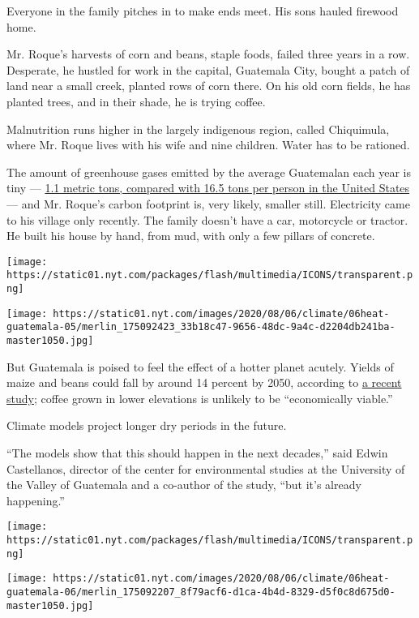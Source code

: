 Everyone in the family pitches in to make ends meet. His sons hauled
firewood home.

Mr. Roque's harvests of corn and beans, staple foods, failed three years
in a row. Desperate, he hustled for work in the capital, Guatemala City,
bought a patch of land near a small creek, planted rows of corn there.
On his old corn fields, he has planted trees, and in their shade, he is
trying coffee.

Malnutrition runs higher in the largely indigenous region, called
Chiquimula, where Mr. Roque lives with his wife and nine children. Water
has to be rationed.

The amount of greenhouse gases emitted by the average Guatemalan each
year is tiny ---
\href{https://data.worldbank.org/indicator/EN.ATM.CO2E.PC?locations=GT}{}
\href{https://data.worldbank.org/indicator/EN.ATM.CO2E.PC?locations=GT}{1.1
metric tons, compared with 16.5 tons per person in the United States}
--- and Mr. Roque's carbon footprint is, very likely, smaller still.
Electricity came to his village only recently. The family doesn't have a
car, motorcycle or tractor. He built his house by hand, from mud, with
only a few pillars of concrete.

\texttt{[image: https://static01.nyt.com/packages/flash/multimedia/ICONS/transparent.png]}

\texttt{[image: https://static01.nyt.com/images/2020/08/06/climate/06heat-guatemala-05/merlin\_175092423\_33b18c47-9656-48dc-9a4c-d2204db241ba-master1050.jpg]}

But Guatemala is poised to feel the effect of a hotter planet acutely.
Yields of maize and beans could fall by around 14 percent by 2050,
according to
\href{https://www.ifpri.org/publication/climate-change-agriculture-and-adaptation-options-guatemala}{}
\href{https://www.ifpri.org/publication/climate-change-agriculture-and-adaptation-options-guatemala}{a
recent study}; coffee grown in lower elevations is unlikely to be
``economically viable.''

Climate models project longer dry periods in the future.

``The models show that this should happen in the next decades,'' said
Edwin Castellanos, director of the center for environmental studies at
the University of the Valley of Guatemala and a co-author of the study,
``but it's already happening.''

\texttt{[image: https://static01.nyt.com/packages/flash/multimedia/ICONS/transparent.png]}

\texttt{[image: https://static01.nyt.com/images/2020/08/06/climate/06heat-guatemala-06/merlin\_175092207\_8f79acf6-d1ca-4b4d-8329-d5f0c8d675d0-master1050.jpg]}

